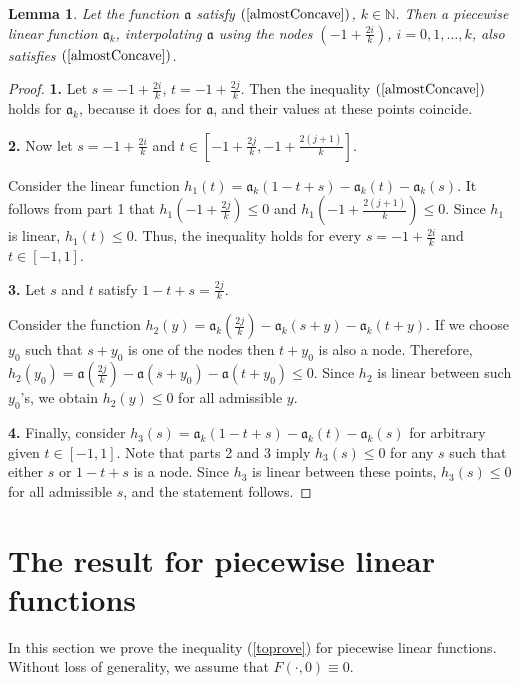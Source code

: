 \documentclass[12pt]{article}
\newcommand{\Nat}{\mathbb N}
\renewcommand{\le}{\leqslant}
\newtheorem{lm}{Lemma}
\begin{document}
\begin{lm}
\label{piecewiseLinearConcave}
Let the function $\mathfrak a$ satisfy $(\ref{almostConcave})$, $k \in \Nat$.
Then a piecewise linear function $\mathfrak a_k$,
interpolating $\mathfrak a$ using the nodes
$(-1 + \frac{2i}{k})$, $i = 0, 1, \dots, k$,
also satisfies $(\ref{almostConcave})$.
\end{lm}
\begin{proof}
{\bf 1.}
Let $s = -1 + \frac{2i}{k}$, $t = -1 + \frac{2j}{k}$.
Then the inequality $(\ref{almostConcave})$ holds for $\mathfrak a_k$, because it does for $\mathfrak a$,
and their values at these points coincide.

{\bf 2.}
Now let $s = -1 + \frac{2i}{k}$ and $t \in [-1 + \frac{2j}{k}, -1 + \frac{2(j + 1)}{k}]$.

Consider the linear function $h_1(t) = \mathfrak a_k( 1 - t + s ) - \mathfrak a_k(t) - \mathfrak a_k(s)$.
It follows from part 1 that $h_1(-1 + \frac{2j}{k}) \le 0$ and $h_1(-1 + \frac{2(j + 1)}{k}) \le 0$.
Since $h_1$ is linear, $h_1(t) \le 0$.
Thus, the inequality holds for every $s = -1 + \frac{2i}{k}$ and $t \in [-1, 1]$.

{\bf 3.}
Let $s$ and $t$ satisfy $1 - t + s = \frac{2j}{k}$.

Consider the function $h_2(y) = \mathfrak a_k(\frac{2j}{k}) - \mathfrak a_k(s + y) - \mathfrak a_k(t + y)$.
If we choose $y_0$ such that $s + y_0$ is one of the nodes then $t + y_0$ is also a node.
Therefore, $h_2(y_0) = \mathfrak a(\frac{2j}{k}) - \mathfrak a(s + y_0) - \mathfrak a(t + y_0) \le 0$.
Since $h_2$ is linear between such $y_0$'s, we obtain $h_2(y) \le 0$ for all admissible $y$.

{\bf 4.}
Finally, consider $h_3(s) = \mathfrak a_k( 1 - t + s ) - \mathfrak a_k(t) - \mathfrak a_k(s)$ for arbitrary given $t \in [-1, 1]$.
Note that parts 2 and 3 imply $h_3(s) \le 0$ for any $s$
such that either $s$ or $1 - t + s$ is a node.
Since $h_3$ is linear between these points, $h_3(s) \le 0$ for all admissible $s$,
and the statement follows.
\end{proof}


\section{The result for piecewise linear functions}

\rm
In this section we prove the inequality (\ref{toprove}) for piecewise linear functions.
Without loss of generality, we assume that $F(\cdot, 0) \equiv 0$.
\end{document}

